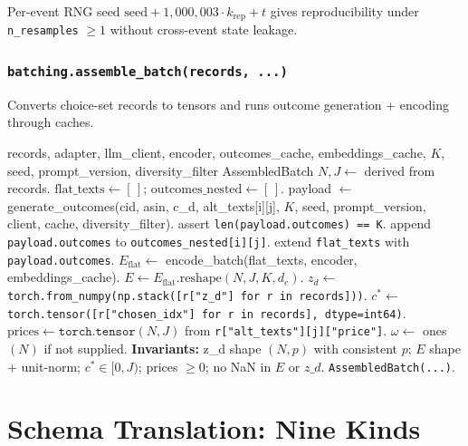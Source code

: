 \documentclass[11pt,a4paper]{article}
\begin{document}
Per-event RNG seed $\mathrm{seed} + 1{,}000{,}003 \cdot k_{\text{rep}} + t$
gives reproducibility under \texttt{n\_resamples} $\ge 1$ without
cross-event state leakage.

\subsubsection*{\texttt{batching.assemble\_batch(records, ...)}}

Converts choice-set records to tensors and runs outcome generation +
encoding through caches.

\begin{algorithm}[H]
\caption{Tensor assembly}
\begin{algorithmic}[1]
\Require records, adapter, llm\_client, encoder, outcomes\_cache, embeddings\_cache, $K$, seed, prompt\_version, diversity\_filter
\Ensure AssembledBatch
\State $N, J \gets$ derived from records.
\State $\text{flat\_texts} \gets [\,]$; $\text{outcomes\_nested} \gets [\,]$.
    \State payload $\gets$ generate\_outcomes(cid, asin, c\_d, alt\_texts[i][j], $K$, seed, prompt\_version, client, cache, diversity\_filter).
    \State assert \texttt{len(payload.outcomes) == K}.
    \State append \texttt{payload.outcomes} to \texttt{outcomes\_nested[i][j]}.
    \State extend \texttt{flat\_texts} with \texttt{payload.outcomes}.
  \EndFor
\EndFor
\State $E_{\text{flat}} \gets$ encode\_batch(flat\_texts, encoder, embeddings\_cache). 
\State $E \gets E_{\text{flat}}.\mathrm{reshape}(N, J, K, d_e)$.
\State $z_d \gets$ \texttt{torch.from\_numpy(np.stack([r["z\_d"] for r in records]))}.
\State $c^* \gets$ \texttt{torch.tensor([r["chosen\_idx"] for r in records], dtype=int64)}.
\State $\text{prices} \gets \texttt{torch.tensor}(N, J)$ from \texttt{r["alt\_texts"][j]["price"]}.
\State $\omega \gets$ ones$(N)$ if not supplied.
\State \textbf{Invariants:} z\_d shape $(N, p)$ with consistent $p$; $E$ shape + unit-norm; $c^* \in [0, J)$; prices $\ge 0$; no NaN in $E$ or $z\_d$.
\State \Return \texttt{AssembledBatch(...)}.
\end{algorithmic}
\end{algorithm}

\section{Schema Translation: Nine Kinds}
\label{sec:schema}
\end{document}

